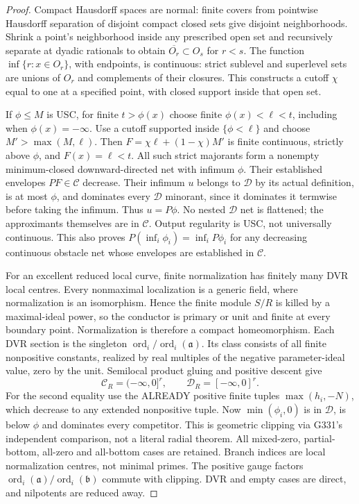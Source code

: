 \documentclass[11pt]{article}
\newcommand{\C}{\mathcal C}
\newcommand{\D}{\mathcal D}
\newcommand{\aideal}{\mathfrak a}
\begin{document}
\begin{proof}
Compact Hausdorff spaces are normal: finite covers from pointwise Hausdorff
separation of disjoint compact closed sets give disjoint neighborhoods.
Shrink a point's neighborhood inside any prescribed open set and recursively
separate at dyadic rationals to obtain $\overline{O_r}\subset O_s$ for $r<s$.
The function $\inf\{r:x\in O_r\}$, with endpoints, is continuous: strict
sublevel and superlevel sets are unions of $O_r$ and complements of their
closures. This constructs a cutoff $\chi$ equal to one at a specified point,
with closed support inside that open set.

If $\phi\le M$ is USC, for finite $t>\phi(x)$ choose finite
$\phi(x)<\ell<t$, including when $\phi(x)=-\infty$. Use a cutoff supported
inside $\{\phi<\ell\}$ and choose $M'>\max(M,\ell)$.
Then $F=\chi\ell+(1-\chi)M'$ is finite continuous, strictly above $\phi$,
and $F(x)=\ell<t$. All such strict majorants form a nonempty minimum-closed
downward-directed net with infimum $\phi$. Their established envelopes
$P F\in\C$ decrease. Their infimum $u$ belongs to $\D$ by its actual definition,
is at most $\phi$, and dominates every $\D$ minorant, since it dominates it
termwise before taking the infimum. Thus $u=P\phi$. No nested $\D$ net is
flattened; the approximants themselves are in $\C$. Output regularity is USC,
not universally continuous. This also proves $P(\inf_i\phi_i)=\inf_iP\phi_i$
for any decreasing continuous obstacle net whose envelopes are established in $\C$.

For an excellent reduced local curve, finite normalization has finitely many
DVR local centres. Every nonmaximal localization is a generic field, where
normalization is an isomorphism. Hence the finite module $S/R$ is killed by
a maximal-ideal power, so the conductor is primary or unit and finite at
every boundary point. Normalization is therefore a compact homeomorphism.
Each DVR section is the singleton $\operatorname{ord}_i/\operatorname{ord}_i(\aideal)$.
Its class consists of all finite nonpositive constants, realized by real
multiples of the negative parameter-ideal value, zero by the unit.
Semilocal product gluing and positive descent give
\[
 \C_R=(-\infty,0]^r,\qquad \D_R=[-\infty,0]^r.
\]
For the second equality use the ALREADY positive finite tuples
$\max(h_i,-N)$, which decrease to any extended nonpositive tuple.
Now $\min(\phi_i,0)$ is in $\D$, is below $\phi$ and dominates every competitor.
This is geometric clipping via G331's independent comparison, not a literal
radial theorem. All mixed-zero, partial-bottom, all-zero and all-bottom cases
are retained. Branch indices are local normalization centres, not minimal
primes. The positive gauge factors $\operatorname{ord}_i(\aideal)/
\operatorname{ord}_i(\mathfrak b)$ commute with clipping. DVR and empty cases
are direct, and nilpotents are reduced away.
\end{proof}
\end{document}
